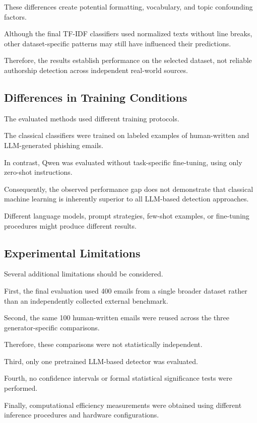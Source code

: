 \documentclass[sigconf,nonacm]{acmart}
\begin{document}
These differences create potential
formatting, vocabulary, and topic
confounding factors.

Although the final TF-IDF classifiers
used normalized texts without line
breaks, other dataset-specific
patterns may still have influenced
their predictions.

Therefore, the results establish
performance on the selected dataset,
not reliable authorship detection
across independent real-world sources.

\subsection{Differences in Training Conditions}

The evaluated methods used different
training protocols.

The classical classifiers were trained
on labeled examples of human-written
and LLM-generated phishing emails.

In contrast, Qwen was evaluated
without task-specific fine-tuning,
using only zero-shot instructions.

Consequently, the observed performance
gap does not demonstrate that classical
machine learning is inherently superior
to all LLM-based detection approaches.

Different language models, prompt
strategies, few-shot examples, or
fine-tuning procedures might produce
different results.

\subsection{Experimental Limitations}

Several additional limitations
should be considered.

First, the final evaluation used
400 emails from a single broader
dataset rather than an independently
collected external benchmark.

Second, the same 100 human-written
emails were reused across the three
generator-specific comparisons.

Therefore, these comparisons were
not statistically independent.

Third, only one pretrained LLM-based
detector was evaluated.

Fourth, no confidence intervals or
formal statistical significance tests
were performed.

Finally, computational efficiency
measurements were obtained using
different inference procedures and
hardware configurations.
\end{document}
